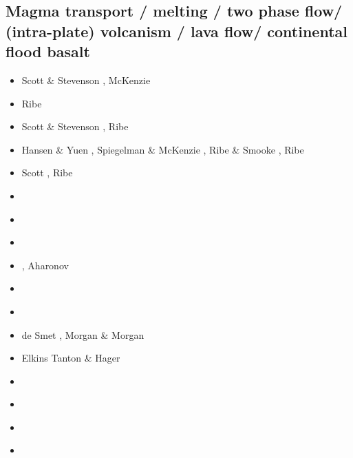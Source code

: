 \subsection{Magma transport / melting / two phase flow/ (intra-plate) volcanism / lava flow/ 
continental flood basalt}

\begin{scriptsize}
\begin{itemize}
\item[\nineteeneightyfour] Scott \& Stevenson \cite{scst84}, McKenzie \cite{mcke84}
\item[\nineteeneightyfive] Ribe \cite{ribe85,ribe85b}
\item[\nineteeneightysix] Scott \& Stevenson \cite{scst86}, Ribe \cite{ribe86}
\item[\nineteeneightyseven] Hansen \& Yuen \cite{hayu87}, Spiegelman \& McKenzie \cite{spmc87},
                            Ribe \& Smooke \cite{rism87}, Ribe \cite{ribe87}
\item[\nineteeneightyeight] Scott \cite{scot88}, Ribe \cite{ribe88b}
\item[\nineteenninety] \cite{hayu90}
\item[\nineteenninetythree] \cite{spie93}\cite{tast93}
\item[\nineteenninetyfour] \cite{jhpp94}\cite{sawy94}
\item[\nineteenninetyfive] \cite{bisc95}\cite{crks95}, Aharonov \etal \cite{ahwk95}
\item[\nineteenninetysix] \cite{laki96}
\item[\nineteenninetyeight] \cite{rabg98}
\item[\nineteenninetynine] de Smet \etal \cite{devv99}, Morgan \& Morgan \cite{momo99}
\item[\twothousand] Elkins Tanton \& Hager \cite{elha00}
\item[\twothousandone] \cite{bers01}
\item[\twothousandtwo] \cite{sobo02}
\item[\twothousandthree] \cite{beri03}
\item[\twothousandfive] \cite{onml05}

\end{itemize}
\end{scriptsize}
